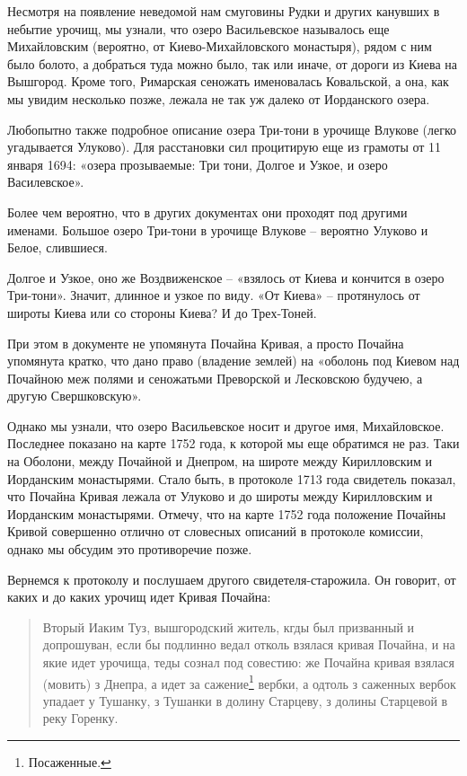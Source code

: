 Несмотря на появление неведомой нам смуговины Рудки и других канувших в небытие урочищ, мы узнали, что озеро Васильевское называлось еще Михайловским (вероятно, от Киево-Михайловского монастыря), рядом с ним было болото, а добраться туда можно было, так или иначе, от дороги из Киева на Вышгород. Кроме того, Римарская сеножать именовалась Ковальской, а она, как мы увидим несколько позже, лежала не так уж далеко от Иорданского озера.

Любопытно также подробное описание озера Три-тони в урочище Влукове (легко угадывается Улуково). Для расстановки сил процитирую еще из грамоты от 11 января 1694: «озера прозываемые: Три тони, Долгое и Узкое, и озеро Василевское».

Более чем вероятно, что в других документах они проходят под другими именами. Большое озеро Три-тони в урочище Влукове – вероятно Улуково и Белое, слившиеся.

Долгое и Узкое, оно же Воздвиженское – «взялось от Киева и кончится в озеро Три-тони». Значит, длинное и узкое по виду. «От Киева» – протянулось от широты Киева или со стороны Киева? И до Трех-Тоней.

При этом в документе не упомянута Почайна Кривая, а просто Почайна упомянута кратко, что дано право (владение землей) на «оболонь под Киевом над Почайною меж полями и сеножатьми Преворской и Лесковскою будучею, а другую Свершковскую».

Однако мы узнали, что озеро Васильевское носит и другое имя, Михайловское. Последнее показано на карте 1752 года, к которой мы еще обратимся не раз. Таки на Оболони, между Почайной и Днепром, на широте между Кирилловским и Иорданским монастырями. Стало быть, в протоколе 1713 года свидетель показал, что Почайна Кривая лежала от Улуково и до широты между Кирилловским и Иорданским монастырями. Отмечу, что на карте 1752 года положение Почайны Кривой совершенно отлично от словесных описаний в протоколе комиссии, однако мы обсудим это противоречие позже.
 
Вернемся к протоколу и послушаем другого свидетеля-старожила. Он говорит, от каких и до каких урочищ идет Кривая Почайна:

\begin{quotation}
Вторый Иаким Туз, вышгородский житель, кгды был призванный и допрошуван, если бы подлинно ведал отколь взялася кривая Почайна, и на якие идет урочища, теды сознал под совестию: же Почайна кривая взялася (мовить) з Днепра, а идет за сажение\footnote{Посаженные.} вербки, а одтоль з саженных вербок упадает у Тушанку, з Тушанки в долину Старцеву, з долины Старцевой в реку Горенку.
\end{quotation}

